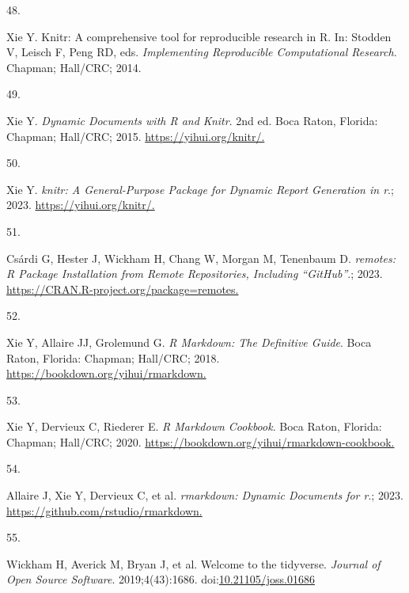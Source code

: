 \documentclass[
]{book}
\newlength{\cslhangindent}
\newlength{\csllabelwidth}
\newlength{\cslentryspacingunit} %
\newenvironment{CSLReferences}[2] %
 {%
  \setlength{\parindent}{0pt}
  \ifodd #1
  \let\oldpar\par
  \def\par{\hangindent=\cslhangindent\oldpar}
  \fi
  \setlength{\parskip}{#2\cslentryspacingunit}
 }%
 {}
\newcommand{\CSLLeftMargin}[1]{\parbox[t]{\csllabelwidth}{#1}}
\newcommand{\CSLRightInline}[1]{\parbox[t]{\linewidth - \csllabelwidth}{#1}\break}
\begin{document}
\begin{CSLReferences}{0}{0}
\leavevmode{}%
\CSLLeftMargin{48. }%
\CSLRightInline{Xie Y. Knitr: A comprehensive tool for reproducible research in {R}. In: Stodden V, Leisch F, Peng RD, eds. \emph{Implementing Reproducible Computational Research}. Chapman; Hall/CRC; 2014.}

\leavevmode{}%
\CSLLeftMargin{49. }%
\CSLRightInline{Xie Y. \emph{Dynamic Documents with {R} and Knitr}. 2nd ed. Boca Raton, Florida: Chapman; Hall/CRC; 2015. \href{https://yihui.org/knitr/}{https://yihui.org/knitr/.}}

\leavevmode{}%
\CSLLeftMargin{50. }%
\CSLRightInline{Xie Y. \emph{{knitr}: A General-Purpose Package for Dynamic Report Generation in r}.; 2023. \href{https://yihui.org/knitr/}{https://yihui.org/knitr/.}}

\leavevmode{}%
\CSLLeftMargin{51. }%
\CSLRightInline{Csárdi G, Hester J, Wickham H, Chang W, Morgan M, Tenenbaum D. \emph{{remotes}: R Package Installation from Remote Repositories, Including {``{GitHub}''}}.; 2023. \href{https://CRAN.R-project.org/package=remotes}{https://CRAN.R-project.org/package=remotes.}}

\leavevmode{}%
\CSLLeftMargin{52. }%
\CSLRightInline{Xie Y, Allaire JJ, Grolemund G. \emph{R Markdown: The Definitive Guide}. Boca Raton, Florida: Chapman; Hall/CRC; 2018. \href{https://bookdown.org/yihui/rmarkdown}{https://bookdown.org/yihui/rmarkdown.}}

\leavevmode{}%
\CSLLeftMargin{53. }%
\CSLRightInline{Xie Y, Dervieux C, Riederer E. \emph{R Markdown Cookbook}. Boca Raton, Florida: Chapman; Hall/CRC; 2020. \href{https://bookdown.org/yihui/rmarkdown-cookbook}{https://bookdown.org/yihui/rmarkdown-cookbook.}}

\leavevmode{}%
\CSLLeftMargin{54. }%
\CSLRightInline{Allaire J, Xie Y, Dervieux C, et al. \emph{{rmarkdown}: Dynamic Documents for r}.; 2023. \href{https://github.com/rstudio/rmarkdown}{https://github.com/rstudio/rmarkdown.}}

\leavevmode{}%
\CSLLeftMargin{55. }%
\CSLRightInline{Wickham H, Averick M, Bryan J, et al. Welcome to the {tidyverse}. \emph{Journal of Open Source Software}. 2019;4(43):1686. doi:\href{https://doi.org/10.21105/joss.01686}{10.21105/joss.01686}}


\end{CSLReferences}
\end{document}
